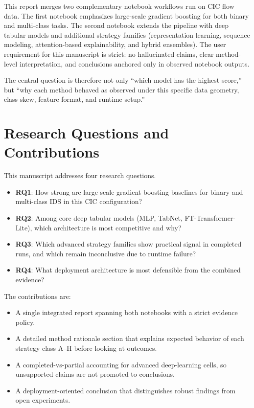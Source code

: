 \documentclass[10pt,journal]{IEEEtran}
\begin{document}
This report merges two complementary notebook workflows run on CIC flow data. The first notebook emphasizes large-scale gradient boosting for both binary and multi-class tasks. The second notebook extends the pipeline with deep tabular models and additional strategy families (representation learning, sequence modeling, attention-based explainability, and hybrid ensembles). The user requirement for this manuscript is strict: no hallucinated claims, clear method-level interpretation, and conclusions anchored only in observed notebook outputs.

The central question is therefore not only ``which model has the highest score,'' but ``why each method behaved as observed under this specific data geometry, class skew, feature format, and runtime setup.''

\section{Research Questions and Contributions}
This manuscript addresses four research questions.

\begin{itemize}
\item \textbf{RQ1}: How strong are large-scale gradient-boosting baselines for binary and multi-class IDS in this CIC configuration?
\item \textbf{RQ2}: Among core deep tabular models (MLP, TabNet, FT-Transformer-Lite), which architecture is most competitive and why?
\item \textbf{RQ3}: Which advanced strategy families show practical signal in completed runs, and which remain inconclusive due to runtime failure?
\item \textbf{RQ4}: What deployment architecture is most defensible from the combined evidence?
\end{itemize}

The contributions are:

\begin{itemize}
\item A single integrated report spanning both notebooks with a strict evidence policy.
\item A detailed method rationale section that explains expected behavior of each strategy class A--H before looking at outcomes.
\item A completed-vs-partial accounting for advanced deep-learning cells, so unsupported claims are not promoted to conclusions.
\item A deployment-oriented conclusion that distinguishes robust findings from open experiments.
\end{itemize}
\end{document}
